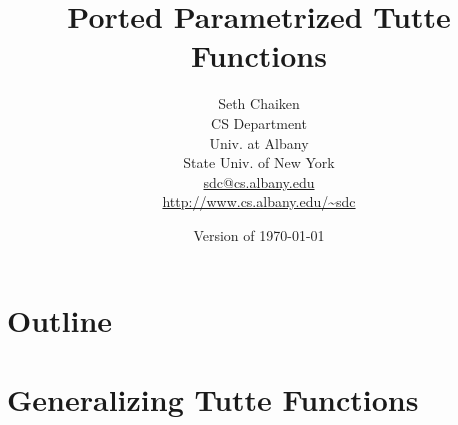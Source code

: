 \documentclass{beamer}
\title{Ported Parametrized Tutte Functions}
\author{Seth Chaiken\\
CS Department\\
Univ. at Albany\\
State Univ. of New York\\
\url{sdc@cs.albany.edu}\\
\url{http://www.cs.albany.edu/~sdc}
}
\date{Version of \today}
\begin{document}
\newcommand{\Remph}[1]{{\color{red}#1}}

\newcommand{\dunion}
{\mbox{\hbox{\hskip6pt$\cdot$\hskip-5.50pt$\cup$\hskip2pt}}}
%

\newcommand{\en}{\;\raisebox{-0.2\height}{}}
\newcommand{\ez}{\;\;\raisebox{-0.2\height}{}}

\newcommand{\pn}{\;\raisebox{-0.2\height}{}}
\newcommand{\qn}{\;\raisebox{-0.2\height}{}}
\newcommand{\pz}{\;\;\raisebox{-0.2\height}{}}
\newcommand{\qz}{\;\;\raisebox{-0.2\height}{}}
\newcommand{\pzqz}{\;\raisebox{-0.2\height}{}}
\newcommand{\pzqn}{\;\raisebox{-0.2\height}{}}
\newcommand{\pnqz}{\;\raisebox{-0.2\height}{}}
\newcommand{\pnqn}{\;\raisebox{-0.2\height}{}}
\newcommand{\pqegg}{\;\raisebox{-0.2\height}{}}

\newcommand{\pnsub}{}
\newcommand{\qnsub}{}
\newcommand{\pzsub}{}
\newcommand{\qzsub}{}
\newcommand{\pzqzsub}{}
\newcommand{\pzqnsub}{}
\newcommand{\pnqzsub}{}
\newcommand{\pnqnsub}{}
\newcommand{\pqeggsub}{}




\begin{frame}
\titlepage
\end{frame}
\section*{Outline}
\begin{frame}
\tableofcontents
\end{frame}

\section{Generalizing Tutte Functions}
\end{document}
